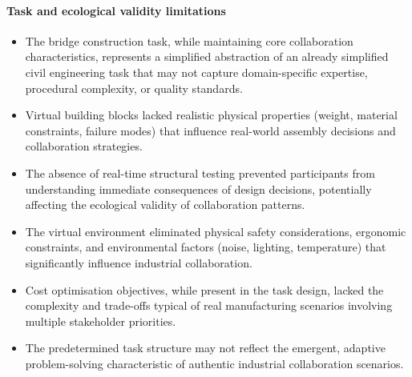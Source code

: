 \paragraph{Task and ecological validity limitations}
\begin{itemize}
    \item The bridge construction task, while maintaining core collaboration characteristics, represents a simplified abstraction of an already simplified civil engineering task that may not capture domain-specific expertise, procedural complexity, or quality standards.
    \item Virtual building blocks lacked realistic physical properties (weight, material constraints, failure modes) that influence real-world assembly decisions and collaboration strategies.
    \item The absence of real-time structural testing prevented participants from understanding immediate consequences of design decisions, potentially affecting the ecological validity of collaboration patterns.
    \item The virtual environment eliminated physical safety considerations, ergonomic constraints, and environmental factors (noise, lighting, temperature) that significantly influence industrial collaboration.
    \item Cost optimisation objectives, while present in the task design, lacked the complexity and trade-offs typical of real manufacturing scenarios involving multiple stakeholder priorities.
    \item The predetermined task structure may not reflect the emergent, adaptive problem-solving characteristic of authentic industrial collaboration scenarios.
\end{itemize}

